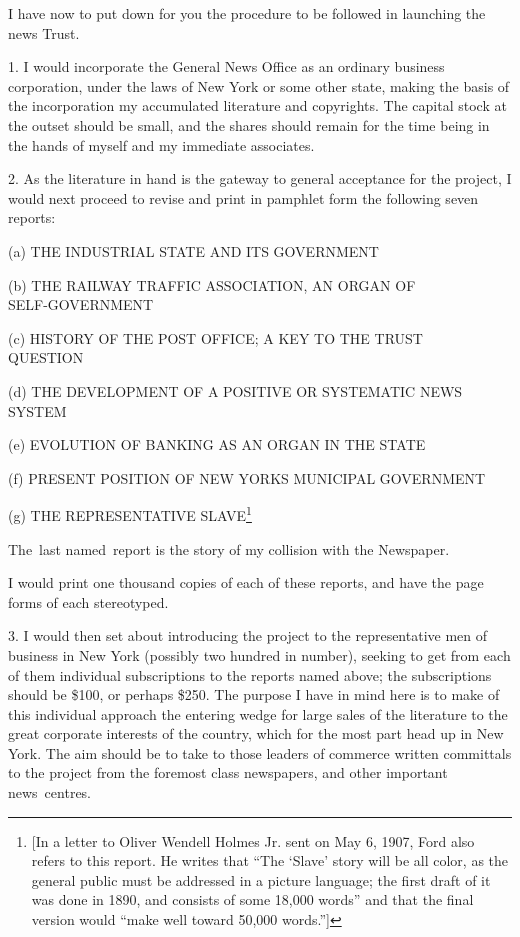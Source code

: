 \documentclass[twoside,symmetric,nobib,justified]{tufte-book}
\begin{document}
I have now to put down for you the procedure to be followed in launching
the news Trust.~

1. I would incorporate the General News Office as an ordinary business
corporation, under the laws of New York or some other state, making the
basis of the incorporation my accumulated literature and copyrights. The
capital stock at the outset should be small, and the shares should
remain for the time being in the hands of myself and my immediate
associates.~~

2. As the literature in hand is the gateway to general acceptance for
the project, I would next proceed to revise and print in pamphlet form
the following seven reports:~

\vspace{0.1in}

\begin{hangparas}{.25in}{1} 

(a) THE INDUSTRIAL STATE AND ITS GOVERNMENT~

(b) THE RAILWAY TRAFFIC ASSOCIATION, AN ORGAN OF\\ SELF-GOVERNMENT

(c) HISTORY OF THE POST OFFICE; A KEY TO THE TRUST QUESTION~~~

(d) THE DEVELOPMENT OF A POSITIVE OR SYSTEMATIC NEWS SYSTEM~~

(e) EVOLUTION OF BANKING AS AN ORGAN IN THE STATE~

(f) PRESENT POSITION OF NEW YORK\textquotesingle S MUNICIPAL
GOVERNMENT~~

(g) THE REPRESENTATIVE SLAVE\footnote{{[}In a letter to Oliver Wendell
  Holmes Jr. sent on May 6, 1907, Ford also refers to this report. He
  writes that ``The `Slave' story will be all color, as the general
  public must be addressed in a picture language; the first draft of it
  was done in 1890, and consists of some 18,000 words'' and that the
  final version would ``make well toward 50,000 words.''{]}}~

\end{hangparas}

\vspace{0.1in}

\enlargethispage{\baselineskip}

The~last named~report is the story of my collision with the Newspaper.~~

I would print one thousand copies of each of these reports, and have the
page forms of each stereotyped.~

3. I would then set about introducing the project to the representative
men of business in New York (possibly two hundred in number), seeking to
get from each of them individual subscriptions to the reports named
above; the subscriptions should be \$100, or perhaps \$250. The purpose
I have in mind here is to make of this individual approach the entering
wedge for large sales of the literature to the great corporate interests
of the country, which for the most part head up in New York. The aim
should be to take to those leaders of commerce written committals to the
project from the foremost class newspapers, and other important
news~centres.
\end{document}
